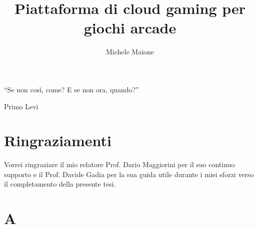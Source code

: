 \documentclass[a4paper, italian, openany]{memoir}
\title{Piattaforma di cloud gaming per giochi arcade}
\author{Michele Maione}
\begin{document}


\frontmatter
{
\raggedleft \large %
	``Se non così, come? E se non ora, quando?''
	
	\bigskip
	
	\textemdash Primo Levi\\
}

\chapter*{Ringraziamenti}
Vorrei ringraziare il mio relatore Prof. Dario Maggiorini per il suo continuo supporto e il Prof. Davide Gadia per la sua guida utile durante i miei sforzi verso il completamento della presente tesi.
\newpage

\tableofcontents



\mainmatter






% 
% 

\appendix

\chapter{A}

\backmatter
\printbibliography[nottype=misc,title={Bibliografia},heading=bibintoc]
\printbibliography[type=misc,title={Sitografia},heading=bibintoc]



\end{document}
